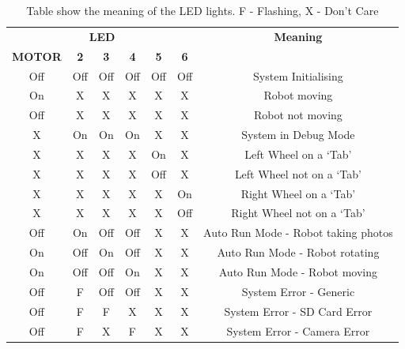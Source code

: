 \begin{table}
\centering
\caption{Table show the meaning of the LED lights. F - Flashing, X - Don't Care}
\label{table:LEDs}
\begin{tabular}{ccccccc}\toprule
\multicolumn{6}{c}{\textbf{LED}} 						& \textbf{Meaning}\\ \cmidrule{1-6}
\textbf{MOTOR} 	& \textbf{2}		& \textbf{3} 	& \textbf{4} 	& \textbf{5} 	& \textbf{6} 	& \\ \toprule
Off		& Off	& Off	& Off	& Off	& Off	& System Initialising \\ \midrule
On		& X		& X		& X		& X		& X		& Robot moving\\\midrule
Off		& X		& X		& X		& X		& X		& Robot not moving\\\midrule
X		& On	& On	& On	& X		& X 	& System in Debug Mode \\\midrule
X		& X		& X		& X		& On	& X		& Left Wheel on a `Tab'	\\\midrule
X		& X		& X		& X		& Off	& X		& Left Wheel not on a `Tab'	\\\midrule
X		& X		& X		& X		& X 	& On	& Right Wheel on a `Tab'	\\\midrule
X		& X		& X		& X		& X		& Off	& Right Wheel not on a `Tab'	\\\midrule
Off		& On	& Off	& Off	& X		& X		& Auto Run Mode - Robot taking photos	\\\midrule
On		& Off	& On	& Off	& X		& X		& Auto Run Mode - Robot rotating	\\\midrule
On		& Off	& Off	& On	& X		& X		& Auto Run Mode - Robot moving\\\midrule
Off		& F		& Off	& Off	& X		& X		& System Error - Generic\\\midrule
Off		& F		& F		& X		& X		& X		& System Error - SD Card Error\\\midrule
Off		& F		& X		& F		& X		& X		& System Error - Camera Error\\ \bottomrule
\end{tabular}
\end{table}
